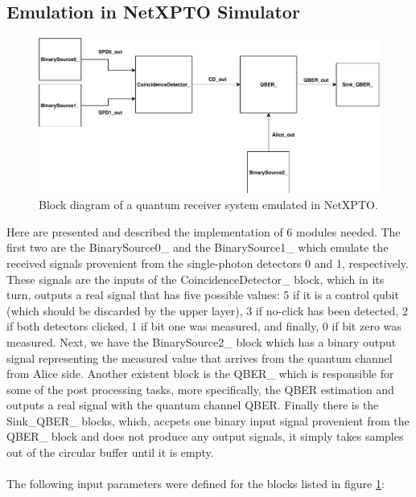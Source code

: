 \begin{refsection}
\subsection{Emulation in NetXPTO Simulator}

\vspace{11pt}

\begin{figure}[H]
	\centering
	\includegraphics[width=0.9\linewidth]{./sdf/arduino_quantum_rx/figures/NetXPTO_implementation.pdf}
	\caption{Block diagram of a quantum receiver system emulated in NetXPTO.}
	\label{fig:netxpto}
\end{figure}

Here are presented and described the implementation of 6 modules needed. The first two are the BinarySource0\_ and the BinarySource1\_ which emulate the received signals provenient from the single-photon detectors 0 and 1, respectively. These signals are the inputs of the CoincidenceDetector\_ block, which in its turn, outputs a real signal that has five possible values: 5 if it is a control qubit (which should be discarded by the upper layer), 3 if no-click has been detected, 2 if both detectors clicked, 1 if bit one was measured, and finally, 0 if bit zero was measured. Next, we have the BinarySource2\_ block which has a binary output signal representing the measured value that arrives from the quantum channel from Alice side. Another existent block is the QBER\_ which is responsible for some of the post processing tasks, more specifically, the QBER estimation and outputs a real signal with the quantum channel QBER. Finally there is the Sink\_QBER\_ blocks, which, accpets one binary input signal provenient from the QBER\_ block and does not produce any output signals, it simply takes samples out of the circular buffer until it is empty.\\ \\

The following input parameters were defined for the blocks listed in figure \ref{fig:netxpto}:


\end{refsection}

